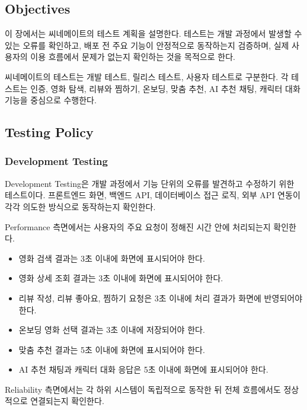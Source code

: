 \documentclass[11pt,a4paper]{article}
\providecommand{\tightlist}{%
  \setlength{\itemsep}{0.25em}\setlength{\parskip}{0.1em}}
\begin{document}
\hypertarget{objectives-6}{%
\subsection{Objectives}\label{objectives-6}}

이 장에서는 씨네메이트의 테스트 계획을 설명한다. 테스트는 개발 과정에서 발생할 수 있는 오류를 확인하고, 배포 전 주요 기능이 안정적으로 동작하는지 검증하며, 실제 사용자의 이용 흐름에서 문제가 없는지 확인하는 것을 목적으로 한다.

씨네메이트의 테스트는 개발 테스트, 릴리스 테스트, 사용자 테스트로 구분한다. 각 테스트는 인증, 영화 탐색, 리뷰와 찜하기, 온보딩, 맞춤 추천, AI 추천 채팅, 캐릭터 대화 기능을 중심으로 수행한다.

\hypertarget{testing-policy}{%
\subsection{Testing Policy}\label{testing-policy}}

\hypertarget{development-testing}{%
\subsubsection{Development Testing}\label{development-testing}}

Development Testing은 개발 과정에서 기능 단위의 오류를 발견하고 수정하기 위한 테스트이다. 프론트엔드 화면, 백엔드 API, 데이터베이스 접근 로직, 외부 API 연동이 각각 의도한 방식으로 동작하는지 확인한다.

Performance 측면에서는 사용자의 주요 요청이 정해진 시간 안에 처리되는지 확인한다.

\begin{itemize}
\tightlist
\item
  영화 검색 결과는 3초 이내에 화면에 표시되어야 한다.
\item
  영화 상세 조회 결과는 3초 이내에 화면에 표시되어야 한다.
\item
  리뷰 작성, 리뷰 좋아요, 찜하기 요청은 3초 이내에 처리 결과가 화면에 반영되어야 한다.
\item
  온보딩 영화 선택 결과는 3초 이내에 저장되어야 한다.
\item
  맞춤 추천 결과는 5초 이내에 화면에 표시되어야 한다.
\item
  AI 추천 채팅과 캐릭터 대화 응답은 5초 이내에 화면에 표시되어야 한다.
\end{itemize}

Reliability 측면에서는 각 하위 시스템이 독립적으로 동작한 뒤 전체 흐름에서도 정상적으로 연결되는지 확인한다.
\end{document}
